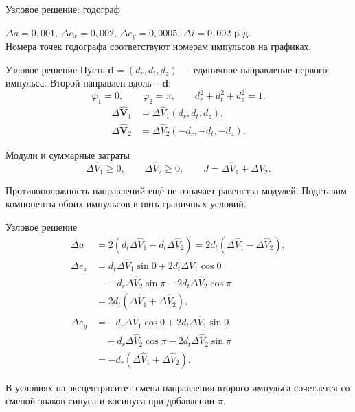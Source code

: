 \documentclass[11pt,aspectratio=169,t]{beamer}
\newcommand{\figcaption}[1]{{\usebeamerfont{caption}\color{coursemuted}#1\par}}
\newcommand{\derivationmathspacing}{%
  \setlength{\abovedisplayskip}{2pt}%
  \setlength{\belowdisplayskip}{3pt}%
  \setlength{\abovedisplayshortskip}{2pt}%
  \setlength{\belowdisplayshortskip}{2pt}%
  \setlength{\jot}{2pt}}
\begin{document}
\begin{frame}{Узловое решение: годограф}
\relax
\centering

\par
\figcaption{$\Delta a=0{,}001$, $\Delta e_x=0{,}002$, $\Delta e_y=0{,}0005$, $\Delta i=0{,}002$ рад.\\
Номера точек годографа соответствуют номерам импульсов на графиках.}
\end{frame}

\begin{frame}{Узловое решение}
\relax
\derivationmathspacing
Пусть $\boldsymbol d=(d_r,d_t,d_z)$ --- единичное направление
первого импульса. Второй направлен вдоль $-\boldsymbol d$:
\[
\varphi_1=0,\qquad \varphi_2=\pi,\qquad
d_r^2+d_t^2+d_z^2=1.
\]
\[
\begin{aligned}
\Delta\widehat{\boldsymbol V}_1
&=\Delta\widehat V_1(d_r,d_t,d_z),\\
\Delta\widehat{\boldsymbol V}_2
&=\Delta\widehat V_2(-d_r,-d_t,-d_z).
\end{aligned}
\]
\begin{block}{Модули и суммарные затраты}
\[
\Delta\widehat V_1\geq0,\qquad
\Delta\widehat V_2\geq0,\qquad
J=\Delta\widehat V_1+\Delta\widehat V_2.
\]
\end{block}
{\justifying
Противоположность направлений ещё не означает равенства модулей.
Подставим компоненты обоих импульсов в пять граничных условий.
\par}
\end{frame}

\begin{frame}{Узловое решение}
\relax
\derivationmathspacing
\[
\begin{aligned}
\Delta a
&=2(d_t\Delta\widehat V_1-d_t\Delta\widehat V_2)
 =2d_t(\Delta\widehat V_1-\Delta\widehat V_2),\\[3pt]
\Delta e_x
&=d_r\Delta\widehat V_1\sin0
  +2d_t\Delta\widehat V_1\cos0\\
&\quad-d_r\Delta\widehat V_2\sin\pi
  -2d_t\Delta\widehat V_2\cos\pi\\
&=2d_t(\Delta\widehat V_1+\Delta\widehat V_2),\\[3pt]
\Delta e_y
&=-d_r\Delta\widehat V_1\cos0
  +2d_t\Delta\widehat V_1\sin0\\
&\quad+d_r\Delta\widehat V_2\cos\pi
  -2d_t\Delta\widehat V_2\sin\pi\\
&=-d_r(\Delta\widehat V_1+\Delta\widehat V_2).
\end{aligned}
\]
{\justifying
В условиях на эксцентриситет смена направления второго импульса
сочетается со сменой знаков синуса и косинуса при добавлении $\pi$.
\par}
\end{frame}
\end{document}
